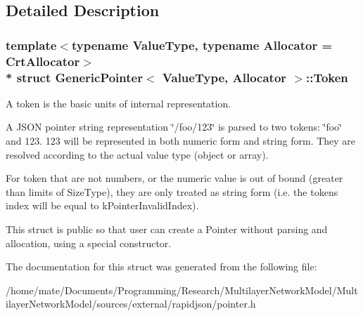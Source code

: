 \subsection{Detailed Description}
\subsubsection*{template$<$typename Value\+Type, typename Allocator = Crt\+Allocator$>$\\*
struct Generic\+Pointer$<$ Value\+Type, Allocator $>$\+::\+Token}

A token is the basic units of internal representation. 

A J\+S\+ON pointer string representation \char`\"{}/foo/123\char`\"{} is parsed to two tokens\+: \char`\"{}foo\char`\"{} and 123. 123 will be represented in both numeric form and string form. They are resolved according to the actual value type (object or array).

For token that are not numbers, or the numeric value is out of bound (greater than limits of Size\+Type), they are only treated as string form (i.\+e. the token\textquotesingle{}s index will be equal to k\+Pointer\+Invalid\+Index).

This struct is public so that user can create a Pointer without parsing and allocation, using a special constructor. 

The documentation for this struct was generated from the following file\+:\begin{DoxyCompactItemize}
\item 
/home/mate/\+Documents/\+Programming/\+Research/\+Multilayer\+Network\+Model/\+Multilayer\+Network\+Model/sources/external/rapidjson/pointer.\+h\end{DoxyCompactItemize}

